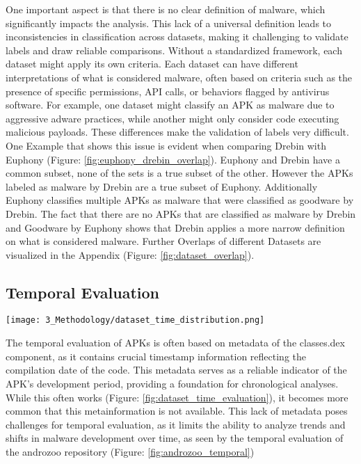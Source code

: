 One important aspect is that there is no clear definition of malware, which significantly impacts the analysis. 
This lack of a universal definition leads to inconsistencies in classification across datasets, making it challenging to validate labels and draw reliable comparisons. 
Without a standardized framework, each dataset might apply its own criteria.
Each dataset can have different interpretations of what is considered malware, 
often based on criteria such as the presence of specific permissions, API calls, or behaviors flagged by antivirus software. 
For example, one dataset might classify an APK as malware due to aggressive adware practices, while another might only consider code executing malicious payloads. 
These differences make the validation of labels very difficult.
One Example that shows this issue is evident when comparing Drebin with Euphony (Figure: \ref{fig:euphony_drebin_overlap}).
Euphony and Drebin have a common subset, none of the sets is a true subset of the other.
However the APKs labeled as malware by Drebin are a true subset of Euphony.
Additionally Euphony classifies multiple APKs as malware that were classified as goodware by Drebin.
The fact that there are no APKs that are classified as malware by Drebin and Goodware by Euphony shows that Drebin applies a more narrow definition on what is considered malware.
Further Overlaps of different Datasets are visualized in the Appendix (Figure: \ref{fig:dataset_overlap}).



\subsection{Temporal Evaluation}

\begin{figure*}[b]
    \centering
    \begin{minipage}{1.5\textwidth}
        \centering
        \texttt{[image: 3\_Methodology/dataset\_time\_distribution.png]}
        \captionsetup{width=\textwidth}
        \caption{\label{fig:dataset_time_evaluation}
        Temporal distribution of Android APKs across three datasets (Drebin, Transcend, and DexRay), 
        categorized into goodware and malware.
        The Data is derived from metadata of the classes.dex file of each APK.
        }
    \end{minipage}
\end{figure*}



The temporal evaluation of APKs is often based on metadata of the classes.dex component, as it contains crucial timestamp information reflecting the compilation date of the code. This metadata serves as a reliable indicator of the APK's development period, providing a foundation for chronological analyses.
While this often works (Figure: \ref{fig:dataset_time_evaluation}), it becomes more common that this metainformation is not available. 
This lack of metadata poses challenges for temporal evaluation, as it limits the ability to analyze trends and shifts in malware development over time, 
as seen by the temporal evaluation of the androzoo repository (Figure: \ref{fig:androzoo_temporal})

